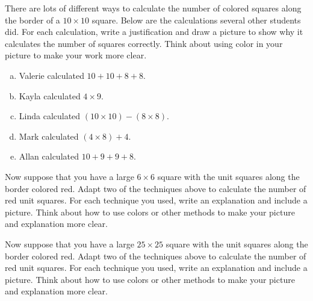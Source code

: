 \begin{problem}
There are lots of different ways to calculate the number of colored squares along the border of a $10\times 10$ square.  Below are the calculations several other students did.  For each calculation, write a justification and draw a picture to show why it calculates the number of squares correctly.  Think about using color in your picture to make your work more clear.

\begin{enumerate}[(a)]
\item
Valerie calculated $10 + 10 + 8 + 8$.\\

\item
Kayla calculated $4 \times 9$.\\


\item
Linda calculated $(10\times 10 ) - ( 8 \times 8 )$.\\

\item
Mark calculated $(4 \times 8) + 4$.\\

\item
Allan calculated $10+9+9+8$.
\end{enumerate}

\end{problem}


\bigskip



\begin{problem}
Now suppose that  you have a  large $6 \times 6$ square with the unit squares along the border  colored red.  Adapt two of the techniques above to calculate the number of red unit squares.
  For each technique you used, write an explanation and include a picture.  Think about how to use colors or other methods to make your picture and explanation more clear.
  \end{problem}
  
  \bigskip
  
  \begin{problem}
Now suppose that  you have a  large $25 \times 25$ square with the unit squares along the border  colored red.  Adapt two of the techniques above to calculate the number of red unit squares.
  For each technique you used, write an explanation and include a picture.  Think about how to use colors or other methods to make your picture and explanation more clear.
  \end{problem}

